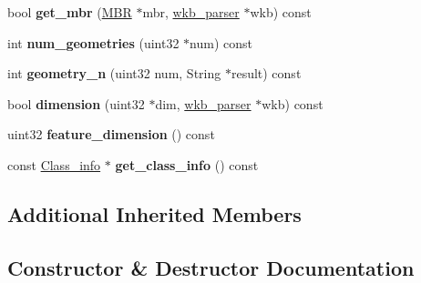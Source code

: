 \begin{DoxyCompactItemize}
bool {\bfseries get\+\_\+mbr} (\mbox{\hyperlink{structMBR}{M\+BR}} $\ast$mbr, \mbox{\hyperlink{classGeometry_1_1wkb__parser}{wkb\+\_\+parser}} $\ast$wkb) const
\item 
\mbox{\label{classGis__geometry__collection_a8152285f684b8b39284436d169085b12}} 
int {\bfseries num\+\_\+geometries} (uint32 $\ast$num) const
\item 
\mbox{\label{classGis__geometry__collection_a945dbf2d12de7eaf3c5fc3196597deac}} 
int {\bfseries geometry\+\_\+n} (uint32 num, String $\ast$result) const
\item 
\mbox{\label{classGis__geometry__collection_a5434030dca8a20210323fdaf1af9d0c5}} 
bool {\bfseries dimension} (uint32 $\ast$dim, \mbox{\hyperlink{classGeometry_1_1wkb__parser}{wkb\+\_\+parser}} $\ast$wkb) const
\item 
\mbox{\label{classGis__geometry__collection_a803c8e5a7313891ffbe09114846e1178}} 
uint32 {\bfseries feature\+\_\+dimension} () const
\item 
\mbox{\label{classGis__geometry__collection_a8ac0ae8aa398822b7470394d3707c1ec}} 
const \mbox{\hyperlink{classGeometry_1_1Class__info}{Class\+\_\+info}} $\ast$ {\bfseries get\+\_\+class\+\_\+info} () const
\end{DoxyCompactItemize}
\subsection*{Additional Inherited Members}


\subsection{Constructor \& Destructor Documentation}
\mbox{\label{classGis__geometry__collection_a744bd0c768fb2b195a9917483071c2a0}} 
